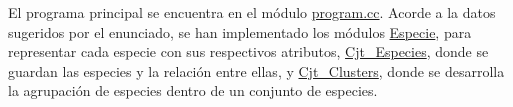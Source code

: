 El programa principal se encuentra en el módulo \hyperlink{program_8cc}{program.\+cc}. Acorde a la datos sugeridos por el enunciado, se han implementado los módulos \hyperlink{class_especie}{Especie}, para representar cada especie con sus respectivos atributos, \hyperlink{class_cjt___especies}{Cjt\+\_\+\+Especies}, donde se guardan las especies y la relación entre ellas, y \hyperlink{class_cjt___clusters}{Cjt\+\_\+\+Clusters}, donde se desarrolla la agrupación de especies dentro de un conjunto de especies. 